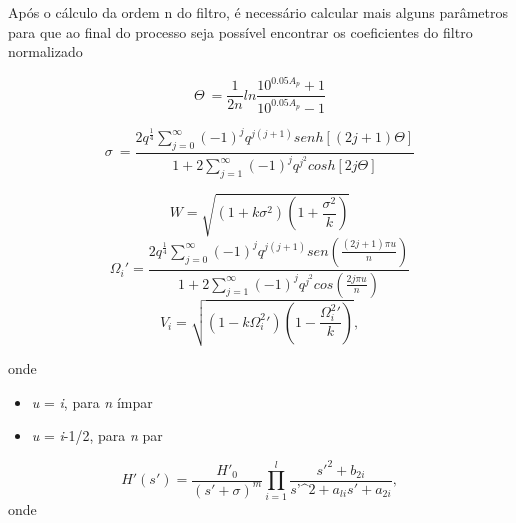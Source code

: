\documentclass[a4paper,10pt]{article}
\begin{document}
	Após o cálculo da ordem n do filtro, é necessário calcular mais alguns parâmetros para que ao final do processo seja possível encontrar os coeficientes do filtro normalizado

	\begin{equation}
		\Theta\ = \frac{1}{2n}ln\frac{10^{0.05A_{p}} + 1}{10^{0.05A_{p}} - 1}
	\end{equation}
	
	\begin{equation}
		\sigma\ =  \frac{2q^{\frac{1}{4}}\sum_{j=0}^{\infty} (-1)^{j} q^{j(j+1)} senh[(2j+1)\Theta]}								{1+2\sum_{j=1}^{\infty}  (-1)^{j} q^{j^{2}} cosh[2j\Theta]}
	\end{equation}
	
	\begin{equation}
		W = \sqrt{(1+k\sigma^{2})(1+\frac{\sigma^{2}}{k})}
	\end{equation}
	\begin{equation}
		\Omega_{i}' =	\frac{2q^{\frac{1}{4}}\sum_{j=0}^{\infty} (-1)^{j} q^{j(j+1)} sen(\frac{(2j+1)\pi 		u}		{n})}								{1+2\sum_{j=1}^{\infty}  (-1)^{j} q^{j^{2}} 					cos(\frac{2j\pi u}			{n})}
	\end{equation}
	\begin{equation}
		V_{i} = \sqrt{(1-k\Omega_{i}^{2}')(1-\frac{\Omega_{i}^{2}'}{k})} ,
	\end{equation}
	
	onde
	
	\begin{itemize}
		\item \textit{u} = \textit{i},  para \textit{n} ímpar
		\item \textit{u} = \textit{i}-1/2,  para \textit{n} par	
	\end{itemize}
	
	\begin{equation}
		H'(\textit{s}') = \frac{H'_{0}}{(\textit{s}'+\sigma)^{m}} \prod_{i=1}^{l} \frac {\textit{s}'^{2} 																						+b_{2i}}														{\textit{s'^{2}}+\textit{a}_{li}\textit{s}'+\textit{a}_{2i}},
	\end{equation}
		onde 
		
\end{document}
